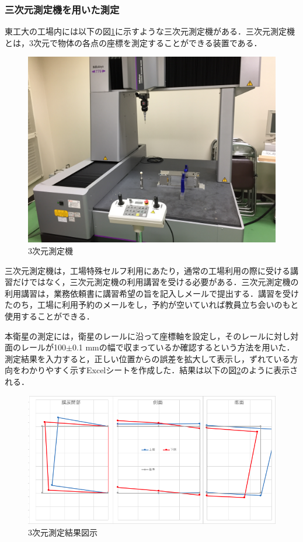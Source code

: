 \subsubsection{三次元測定機を用いた測定}

東工大の工場内には以下の図\ref{fig:3dmeasurementmachine}に示すような三次元測定機がある．三次元測定機とは，3次元で物体の各点の座標を測定することができる装置である．

\begin{figure}[h]
	\begin{center}
		
		\includegraphics[width=0.6\linewidth]{04/fig/3dmeasurementmashine.JPG}
		\caption{3次元測定機}
		\label{fig:3dmeasurementmachine}
		
	\end{center}
\end{figure}

三次元測定機は，工場特殊セルフ利用にあたり，通常の工場利用の際に受ける講習だけではなく，三次元測定機の利用講習を受ける必要がある．三次元測定機の利用講習は，業務依頼書に講習希望の旨を記入しメールで提出する．講習を受けたのち，工場に利用予約のメールをし，予約が空いていれば教員立ち会いのもと使用することができる．

本衛星の測定には，衛星のレールに沿って座標軸を設定し，そのレールに対し対面のレールが100$\pm$0.1 mmの幅で収まっているか確認するという方法を用いた．測定結果を入力すると，正しい位置からの誤差を拡大して表示し，ずれている方向をわかりやすく示すExcelシートを作成した．結果は以下の図\ref{fig:3dmeasurementresult}のように表示される．

\begin{figure}[h]
	\begin{center}
		
		\includegraphics[width=0.8\linewidth]{04/fig/3dmeasurementresult.png}
		\caption{3次元測定結果図示}
		\label{fig:3dmeasurementresult}
		
	\end{center}
\end{figure}

